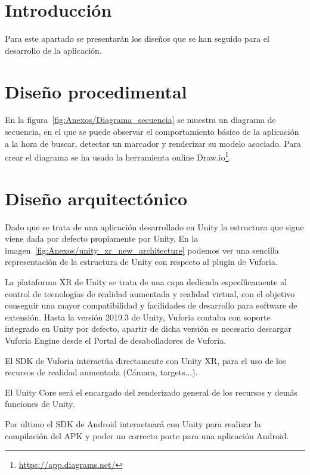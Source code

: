 
\section{Introducción}
 Para este apartado se presentarán los diseños que se han seguido para el desarrollo de la aplicación.
 

\section{Diseño procedimental}
En la figura~\ref{fig:Anexos/Diagrama_secuencia} se muestra un diagrama de secuencia, en el que se puede observar el comportamiento básico de la aplicación a la hora de buscar, detectar un marcador y renderizar su modelo asociado. Para crear el diagrama se ha usado la herramienta online Draw.io\footnote{\url{https://app.diagrams.net/}}.



\section{Diseño arquitectónico}


Dado que se trata de una aplicación desarrollado en Unity la estructura que sigue viene dada por defecto propiamente por Unity. En la imagen~\ref{fig:Anexos/unity_xr_new_architecture} podemos ver una sencilla representación de la estructura de Unity con respecto al plugin de Vuforia. 

La plataforma XR de Unity se trata de una capa dedicada específicamente al control de tecnologías de realidad aumentada y realidad virtual, con el objetivo conseguir una mayor compatibilidad y facilidades de desarrollo para software de extensión. Hasta la versión 2019.3 de Unity, Vuforia contaba con soporte integrado en Unity por defecto, apartir de dicha versión es necesario descargar Vuforia Engine desde el Portal de desabolladores de Vuforia. 

 
El SDK de Vuforia interactúa directamente con Unity XR, para el uso de los recursos de realidad aumentada (Cámara, targets...). 

El Unity Core será el encargado del renderizado general de los recursos y demás funciones de Unity.

Por ultimo el SDK de Android interactuará con Unity para realizar la compilación del APK y poder un correcto porte para una aplicación Android.


